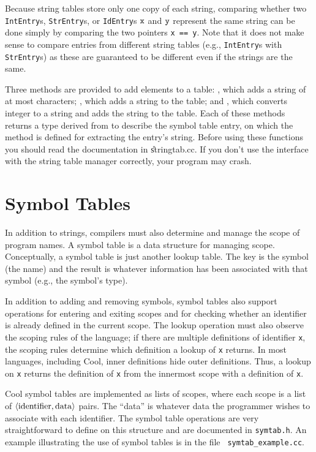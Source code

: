 Because string tables store only one copy of each string, comparing
whether two {\tt IntEntry}s, {\tt StrEntry}s, or {\tt IdEntry}s $\tt x$
and $\tt y$ represent the same string can be done simply by comparing
the two pointers {\tt x == y}.  Note that it does not make sense to
compare entries from different string tables (e.g., {\tt IntEntry}s
with {\tt StrEntry}s) as these are guaranteed to be different even if
the strings are the same.


Three
methods are provided to add elements to a table: ,
which adds a string  of at most  characters; ,
which adds a string  to the table; and , which converts
integer  to a string and adds the string to the table.
Each of these methods returns a type derived from 
to describe the symbol table entry,  on which the method 
is defined for extracting the entry's string.  Before using these functions you
should read the documentation in \U{stringtab.cc}.  If you don't use
the interface with the string table manager correctly, your program may
crash.

\section{Symbol Tables}

In addition to strings, compilers must also determine and manage the
scope of program names.  A symbol table is a data structure for
managing scope.  Conceptually, a symbol table is just another lookup
table.  The key is the symbol (the name) and the result is whatever
information has been associated with that symbol (e.g., the symbol's
type).

In addition to adding and removing symbols, symbol tables also support
operations for entering and exiting scopes and for checking whether an
identifier is already defined in the current scope.  The lookup
operation must also observe the scoping rules of the language; if
there are multiple definitions of identifier {\tt x}, the scoping
rules determine which definition a lookup of {\tt x} returns.  In most
languages, including Cool, inner definitions hide outer definitions.
Thus, a lookup on {\tt x} returns the definition of {\tt x} from the
innermost scope with a definition of {\tt x}.

Cool symbol tables are implemented as lists of scopes, where each
scope is a list of $\rm \langle identifier,data \rangle$ pairs.  The ``data''
is whatever data the programmer wishes to associate with each
identifier.  The symbol table operations are very straightforward to
define on this structure and are documented in {\tt symtab.h}.  An
example illustrating the use of symbol tables is in the file {\tt
symtab\_example.cc}.

